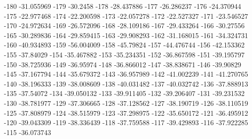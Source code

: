 -180                      -31.055969
-179                        -30.2458
-178                      -28.437886
-177                      -26.286237
-176                      -24.370944
-175                      -22.977468
-174                      -22.200598
-173                      -22.057278
-172                      -22.527327
-171                      -23.546527
-170                      -24.972634
-169                      -26.572096
-168                      -28.109186
-167                      -29.433264
-166                       -30.27556
-165                      -30.289836
-164                      -29.859415
-163                      -29.908293
-162                      -31.168015
-161                      -34.324731
-160                      -40.934893
-159                      -56.004009
-158                       -45.79824
-157                      -44.476744
-156                      -42.153362
-155                       -37.84029
-154                      -35.467882
-153                      -35.234351
-152                      -36.867598
-151                      -39.195797
-150                      -38.725936
-149                       -36.95974
-148                      -36.866012
-147                      -38.838671
-146                       -39.90829
-145                      -37.167794
-144                      -35.679372
-143                      -36.957989
-142                      -41.002239
-141                      -41.270765
-140                      -38.196333
-139                      -38.008609
-138                      -40.031482
-137                      -40.032742
-136                      -37.888913
-135                       -37.54072
-134                      -39.050132
-133                      -39.911405
-132                      -39.206407
-131                      -39.231532
-130                      -38.781977
-129                      -37.306665
-128                      -37.128562
-127                      -38.190719
-126                      -38.110519
-125                      -37.808979
-124                      -38.515979
-123                      -37.298975
-122                      -35.650172
-121                      -36.495912
-120                      -39.043309
-119                      -38.336439
-118                      -37.759588
-117                      -39.429893
-116                      -37.922285
-115                      -36.073743
